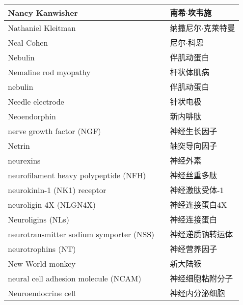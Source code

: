 \begin{longtable}{lll}
	\midrule
	Nancy Kanwisher   &&  南希$\cdot$坎韦施 \\
	
	\midrule
	Nathaniel Kleitman   &&  纳撒尼尔$\cdot$克莱特曼 \\
	
	\midrule
	Neal Cohen   &&  尼尔$\cdot$科恩 \\
	
	\midrule
	Nebulin   &&  伴肌动蛋白 \\
	
	\midrule
	Nemaline rod myopathy   &&  杆状体肌病 \\
	
	\midrule
	nebulin   &&  伴肌动蛋白 \\
	
	\midrule
	Needle electrode   &&  针状电极 \\
	
	\midrule
	Neoendorphin   &&  新内啡肽 \\
	
	\midrule
	nerve growth factor (NGF)   &&  神经生长因子 \\
	
	\midrule
	Netrin   &&  轴突导向因子 \\
	
	\midrule
	neurexins   &&  神经外素 \\
	
	\midrule
	neurofilament heavy polypeptide (NFH)   &&  神经丝重多肽 \\
	
	\midrule
	neurokinin-1 (NK1) receptor   && 神经激肽受体-1 \\
	
	\midrule
	neuroligin 4X (NLGN4X)  && 神经连接蛋白4X \\
	
	\midrule
	Neuroligins (NLs)   && 神经连接蛋白 \\
	
	\midrule
	neurotransmitter sodium symporter (NSS)  && 神经递质钠转运体 \\
	
	\midrule
	neurotrophins (NT)   && 神经营养因子 \\
	
	\midrule
	New World monkey   && 新大陆猴 \\
	
	\midrule
	neural cell adhesion molecule (NCAM)  && 神经细胞粘附分子 \\
	
	\midrule
	Neuroendocrine cell   && 神经内分泌细胞 \\
	

\end{longtable}

